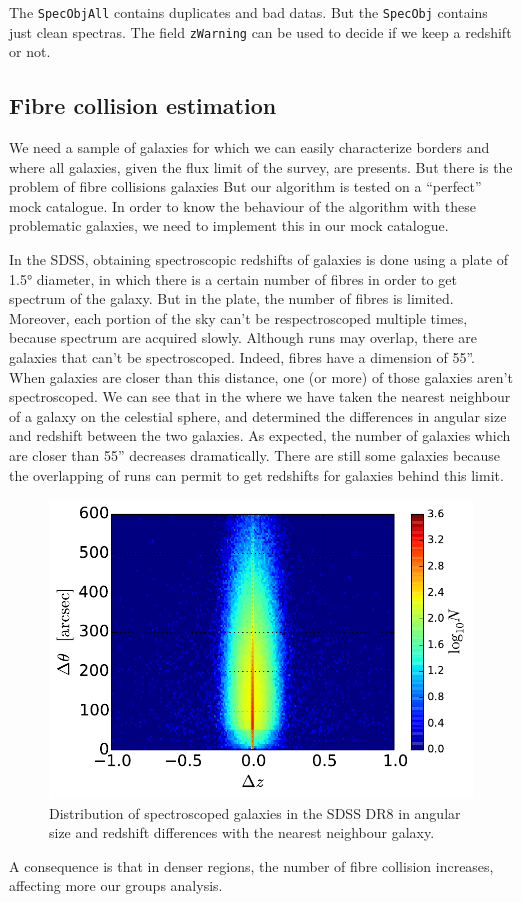 The \texttt{SpecObjAll} contains duplicates and bad datas. But the
\texttt{SpecObj} contains just clean spectras. The field \texttt{zWarning} can
be used to decide if we keep a redshift or not.

\subsection{Fibre collision estimation}

We need a sample of galaxies for which we can easily characterize borders and
where all galaxies, given the flux limit of the survey, are presents. But there
is the problem of fibre collisions galaxies But our algorithm is tested on a
``perfect'' mock catalogue. In order to know the behaviour of the algorithm
with these problematic galaxies, we need to implement this in our mock
catalogue.

In the SDSS, obtaining spectroscopic redshifts of galaxies is done using a
plate of 1.5° diameter, in which there is a certain number of fibres in order
to get spectrum of the galaxy. But in the plate, the number of fibres is
limited. Moreover, each portion of the sky can't be respectroscoped multiple
times, because spectrum are acquired slowly. Although runs may overlap, there
are galaxies that can't be spectroscoped. Indeed, fibres have a dimension of
55''. When galaxies are closer than this distance, one (or more) of those
galaxies aren't spectroscoped. We can see that in the 
where we have taken the nearest neighbour of a galaxy on the celestial sphere,
and determined the differences in angular size and redshift between the two
galaxies. As expected, the number of galaxies which are closer than 55''
decreases dramatically. There are still some galaxies because the overlapping
of runs can permit to get redshifts for galaxies behind this limit.
%
\begin{figure}[ht] \centering
    \includegraphics[width=0.6\linewidth]{figures/sdss/plane.pdf}
    \caption{\footnotesize{}Distribution of spectroscoped galaxies in the SDSS
    DR8 in angular size and redshift differences with the nearest neighbour
galaxy.\label{fig:plane}} \end{figure}
%
A consequence is that in denser regions, the number of fibre collision
increases, affecting more our groups analysis.

